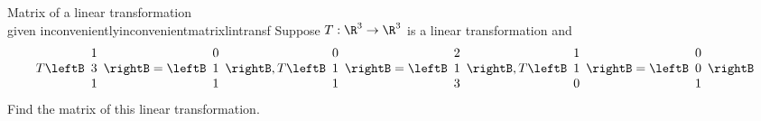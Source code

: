 \begin{example}{Matrix of a linear transformation \\ given inconveniently}{inconvenientmatrixlintransf}
Suppose $T:\R^{3}\rightarrow \R^{3}$ is a linear
transformation and
\begin{equation*}
T\leftB
\begin{array}{r}
1 \\
3 \\
1
\end{array}
\rightB =\leftB
\begin{array}{r}
0 \\
1 \\
1
\end{array}
\rightB ,T\leftB
\begin{array}{r}
0 \\
1 \\
1
\end{array}
\rightB =\leftB
\begin{array}{r}
2 \\
1 \\
3
\end{array}
\rightB ,T\leftB
\begin{array}{r}
1 \\
1 \\
0
\end{array}
\rightB =\leftB
\begin{array}{r}
0 \\
0 \\
1
\end{array}
\rightB
\end{equation*}
Find the matrix of this linear transformation.
\end{example}

